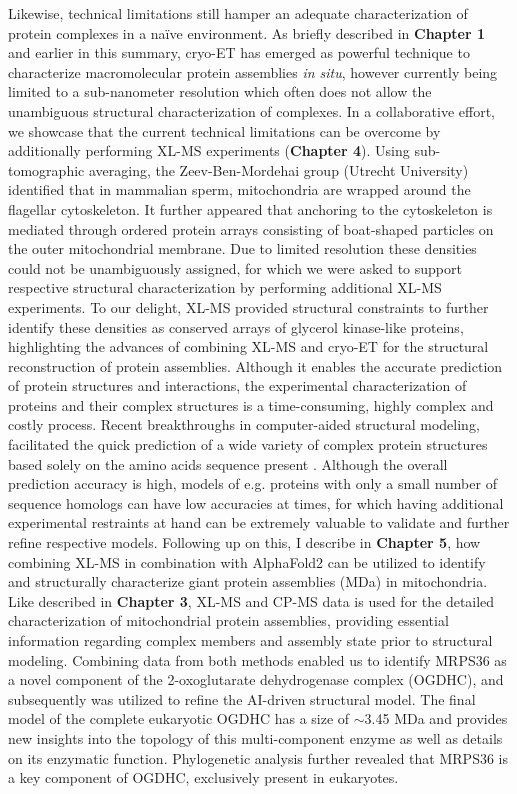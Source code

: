 Likewise, technical limitations still hamper an adequate characterization of protein complexes in a naïve environment. As briefly described in \textbf{Chapter 1} and earlier in this summary, cryo-ET has emerged as powerful technique to characterize macromolecular protein assemblies \emph{in situ}, however currently being limited to a sub-nano\-meter resolution which often does not allow the unambiguous structural characterization of complexes. In a collaborative effort, we showcase that the current technical limitations can be overcome by additionally performing XL-MS experiments (\textbf{Chapter 4}). Using sub-tomographic averaging, the Zeev-Ben-Mordehai group (Utrecht University) identified that in mammalian sperm, mitochondria are wrapped around the flagellar cytoskeleton. It further appeared that anchoring to the cytoskeleton is mediated through ordered protein arrays consisting of boat-shaped particles on the outer mitochondrial membrane. Due to limited resolution these densities could not be unambiguously assigned, for which we were asked to support respective structural characterization by performing additional XL-MS experiments. To our delight, XL-MS provided structural constraints to further identify these densities as conserved arrays of glycerol kinase-like proteins, highlighting the advances of combining XL-MS and cryo-ET for the structural reconstruction of protein assemblies.
Although it enables the accurate prediction of protein structures and interactions, the experimental characterization of proteins and their complex structures is a time-consuming, highly complex and costly process. Recent breakthroughs in computer-aided structural modeling, facilitated the quick prediction of a wide variety of complex protein structures based solely on the amino acids sequence present \cite{RN5, RN4}. Although the overall prediction accuracy is high, models of e.g. proteins with only a small number of sequence homologs can have low accuracies at times, for which having additional experimental restraints at hand can be extremely valuable to validate and further refine respective models. Following up on this, I describe in \textbf{Chapter 5}, how combining XL-MS in combination with AlphaFold2 \cite{RN4} can be utilized to identify and structurally characterize giant protein assemblies (MDa) in mitochondria. Like described in \textbf{Chapter 3}, XL-MS and CP-MS data is used for the detailed characterization of mitochondrial protein assemblies, providing essential information regarding complex members and assembly state prior to structural modeling. Combining data from both methods enabled us to identify MRPS36 as a novel component of the 2-oxoglutarate dehydrogenase complex (OGDHC), and subsequently was utilized to refine the AI-driven structural model. The final model of the complete eukaryotic OGDHC has a size of $\sim$3.45 MDa and provides new insights into the topology of this multi-component enzyme as well as details on its enzymatic function. Phylogenetic analysis further revealed that MRPS36 is a key component of OGDHC, exclusively present in eukaryotes.
%
